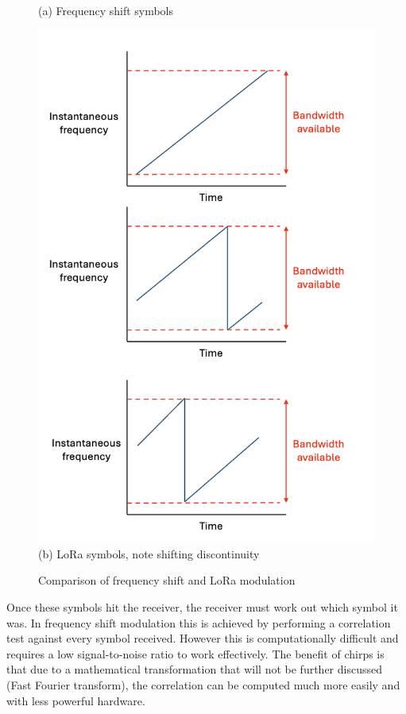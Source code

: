 \begin{figure}[H]
\begin{minipage}{0.48\textwidth}
    \\[4pt]
    {\small (a) Frequency shift symbols} \end{minipage}\hfill
  \begin{minipage}{0.48\textwidth}
    \centering
    \includegraphics[width=0.9\linewidth]{contents/part-1/fig1/lora-wavechart.png}
    \\[4pt]
    {\small (b) LoRa symbols, note shifting discontinuity}
  \end{minipage}
  \caption{ Comparison of frequency shift and LoRa modulation }
  \label{fig:freq-vs-lora}
\end{figure}

Once these symbols hit the receiver, the receiver must work out which symbol it
was. In frequency shift modulation this is achieved by performing a correlation
test against every symbol received. However this is computationally difficult
and requires a low signal-to-noise ratio to work effectively. The benefit of
chirps is that due to a mathematical transformation that will not be further
discussed (Fast Fourier transform), the correlation can be computed much more
easily and with less powerful hardware.

